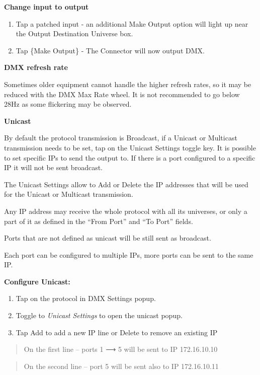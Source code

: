 \documentclass[
]{article}
\begin{document}
\textbf{Change input to output}

\begin{enumerate}
\def\labelenumi{\arabic{enumi}.}
\item
  Tap a patched input - an additional Make Output option will light up near the Output Destination Universe box.
\item
  Tap \{Make Output\} - The Connector will now output DMX.
\end{enumerate}

\textbf{DMX refresh rate}

Sometimes older equipment cannot handle the higher refresh rates, so it may be reduced with the DMX Max Rate wheel. It is not recommended to go below 28Hz as some flickering may be observed.

\textbf{Unicast}

By default the protocol transmission is Broadcast, if a Unicast or Multicast transmission needs to be set, tap on the Unicast Settings toggle key. It is possible to set specific IPs to send the output to. If there is a port configured to a specific IP it will not be sent broadcast.

The Unicast Settings allow to Add or Delete the IP addresses that will be used for the Unicast or Multicast transmission.

Any IP address may receive the whole protocol with all its universes, or only a part of it as defined in the ``From Port'' and ``To Port'' fields.

Ports that are not defined as unicast will be still sent as broadcast.

Each port can be configured to multiple IPs, more ports can be sent to the same IP.

\textbf{Configure Unicast:}

\begin{enumerate}
\def\labelenumi{\arabic{enumi}.}
\item
  Tap on the protocol in DMX Settings popup.
\item
  Toggle to \emph{Unicast Settings} to open the unicast popup.
\item
  Tap Add to add a new IP line or Delete to remove an existing IP
\end{enumerate}

\begin{quote}
On the first line -- ports 1 ⟶ 5 will be sent to IP 172.16.10.10
\end{quote}

\begin{quote}
On the second line -- port 5 will be sent also to IP 172.16.10.11
\end{quote}
\end{document}
